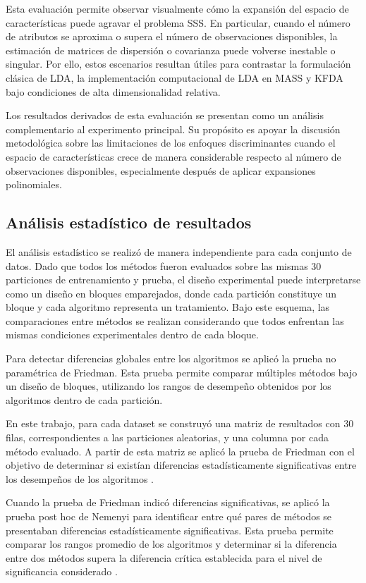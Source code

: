 Esta evaluación permite observar visualmente cómo la expansión del espacio de características puede agravar el problema SSS. En particular, cuando el número de atributos se aproxima o supera el número de observaciones disponibles, la estimación de matrices de dispersión o covarianza puede volverse inestable o singular. Por ello, estos escenarios resultan útiles para contrastar la formulación clásica de LDA, la implementación computacional de LDA en MASS y KFDA bajo condiciones de alta dimensionalidad relativa.

Los resultados derivados de esta evaluación se presentan como un análisis complementario al experimento principal. Su propósito es apoyar la discusión metodológica sobre las limitaciones de los enfoques discriminantes cuando el espacio de características crece de manera considerable respecto al número de observaciones disponibles, especialmente después de aplicar expansiones polinomiales.



\subsection{Análisis estadístico de resultados}

El análisis estadístico se realizó de manera independiente para cada conjunto de datos. Dado que todos los métodos fueron evaluados sobre las mismas 30 particiones de entrenamiento y prueba, el diseño experimental puede interpretarse como un diseño en bloques emparejados, donde cada partición constituye un bloque y cada algoritmo representa un tratamiento. Bajo este esquema, las comparaciones entre métodos se realizan considerando que todos enfrentan las mismas condiciones experimentales dentro de cada bloque.

Para detectar diferencias globales entre los algoritmos se aplicó la prueba no paramétrica de Friedman. Esta prueba permite comparar múltiples métodos bajo un diseño de bloques, utilizando los rangos de desempeño obtenidos por los algoritmos dentro de cada partición.

En este trabajo, para cada dataset se construyó una matriz de resultados con 30 filas, correspondientes a las particiones aleatorias, y una columna por cada método evaluado. A partir de esta matriz se aplicó la prueba de Friedman con el objetivo de determinar si existían diferencias estadísticamente significativas entre los desempeños de los algoritmos \cite{pereira2015overview}.

Cuando la prueba de Friedman indicó diferencias significativas, se aplicó la prueba post hoc de Nemenyi para identificar entre qué pares de métodos se presentaban diferencias estadísticamente significativas. Esta prueba permite comparar los rangos promedio de los algoritmos y determinar si la diferencia entre dos métodos supera la diferencia crítica establecida para el nivel de significancia considerado \cite{demvsar2006statistical}.

